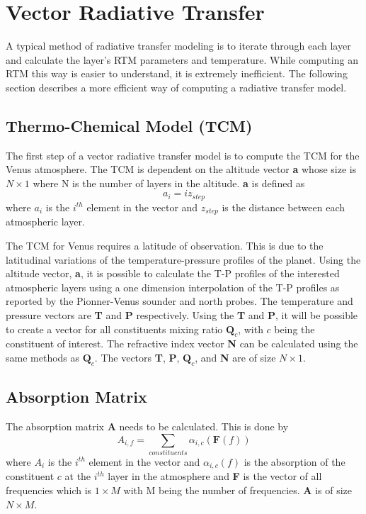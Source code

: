 \section{Vector Radiative Transfer}
A typical method of radiative transfer modeling is to iterate through each layer and calculate the layer's RTM parameters and temperature. 
While computing an RTM this way is easier to understand, it is extremely inefficient. The following section describes a more efficient way of computing a radiative transfer model.
\subsection{Thermo-Chemical Model (TCM)}
The first step of a vector radiative transfer model is to compute the TCM for the Venus atmosphere. The TCM is dependent on the altitude vector \textbf{a} whose size is $N\times 1$ where N is the number of layers in the altitude. \textbf{a} is defined as
\begin{equation}
a_i = iz_{step}
\end{equation}
where $a_i$ is the $i^{th}$ element in the vector and $z_{step}$ is the distance between each atmospheric layer. 

The TCM for Venus requires a latitude of observation. This is due to the latitudinal variations of the temperature-pressure profiles of the planet. 
Using the altitude vector, \textbf{a}, it is possible to calculate the T-P profiles of the interested atmospheric layers using a one dimension interpolation of the T-P profiles as reported by the Pionner-Venus sounder and north probes. 
The temperature and pressure vectors are \textbf{T} and \textbf{P} respectively. Using the \textbf{T} and \textbf{P}, it will be possible to create a vector for all constituents mixing ratio $\textbf{Q}_{c}$, with $c$ being the constituent of interest. The refractive index vector \textbf{N} can be calculated using the same methods as $\textbf{Q}_{c}$. The vectors \textbf{T}, \textbf{P}, $\textbf{Q}_{c}$, and \textbf{N} are of size $N\times 1$.

\subsection{Absorption Matrix}
The absorption matrix \textbf{A} needs to be calculated. This is done by
\begin{equation}
A_{i,f} = \sum_{constituents} \alpha_{i,c}(\textbf{F}(f))
\end{equation}
where $A_i$ is the $i^{th}$ element in the vector and $\alpha_{i,c}(f)$ is the absorption of the constituent $c$ at the $i^{th}$ layer in the atmosphere  and \textbf{F} is the vector of all frequencies which is $1 \times M$ with M being the number of frequencies. \textbf{A} is of size $N \times M$.

